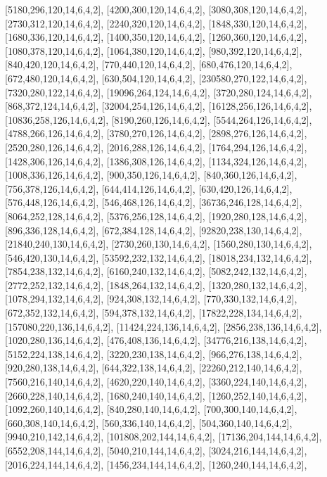 \documentclass[12pt]{amsart}
\begin{document}
[5180,296,120,14,6,4,2],   [4200,300,120,14,6,4,2],   [3080,308,120,14,6,4,2],   [2730,312,120,14,6,4,2],   [2240,320,120,14,6,4,2],   [1848,330,120,14,6,4,2],
[1680,336,120,14,6,4,2],   [1400,350,120,14,6,4,2],   [1260,360,120,14,6,4,2],   [1080,378,120,14,6,4,2],   [1064,380,120,14,6,4,2],   [980,392,120,14,6,4,2],
[840,420,120,14,6,4,2],   [770,440,120,14,6,4,2],   [680,476,120,14,6,4,2],   [672,480,120,14,6,4,2],   [630,504,120,14,6,4,2],   [230580,270,122,14,6,4,2],
[7320,280,122,14,6,4,2],   [19096,264,124,14,6,4,2],   [3720,280,124,14,6,4,2],   [868,372,124,14,6,4,2],   [32004,254,126,14,6,4,2],   [16128,256,126,14,6,4,2],
[10836,258,126,14,6,4,2],   [8190,260,126,14,6,4,2],   [5544,264,126,14,6,4,2],   [4788,266,126,14,6,4,2],   [3780,270,126,14,6,4,2],   [2898,276,126,14,6,4,2],
[2520,280,126,14,6,4,2],   [2016,288,126,14,6,4,2],   [1764,294,126,14,6,4,2],   [1428,306,126,14,6,4,2],   [1386,308,126,14,6,4,2],   [1134,324,126,14,6,4,2],
[1008,336,126,14,6,4,2],   [900,350,126,14,6,4,2],   [840,360,126,14,6,4,2],   [756,378,126,14,6,4,2],   [644,414,126,14,6,4,2],   [630,420,126,14,6,4,2],
[576,448,126,14,6,4,2],   [546,468,126,14,6,4,2],   [36736,246,128,14,6,4,2],   [8064,252,128,14,6,4,2],   [5376,256,128,14,6,4,2],   [1920,280,128,14,6,4,2],
[896,336,128,14,6,4,2],   [672,384,128,14,6,4,2],   [92820,238,130,14,6,4,2],   [21840,240,130,14,6,4,2],   [2730,260,130,14,6,4,2],   [1560,280,130,14,6,4,2],
[546,420,130,14,6,4,2],   [53592,232,132,14,6,4,2],   [18018,234,132,14,6,4,2],   [7854,238,132,14,6,4,2],   [6160,240,132,14,6,4,2],   [5082,242,132,14,6,4,2],
[2772,252,132,14,6,4,2],   [1848,264,132,14,6,4,2],   [1320,280,132,14,6,4,2],   [1078,294,132,14,6,4,2],   [924,308,132,14,6,4,2],   [770,330,132,14,6,4,2],
[672,352,132,14,6,4,2],   [594,378,132,14,6,4,2],   [17822,228,134,14,6,4,2],   [157080,220,136,14,6,4,2],   [11424,224,136,14,6,4,2],   [2856,238,136,14,6,4,2],
[1020,280,136,14,6,4,2],   [476,408,136,14,6,4,2],   [34776,216,138,14,6,4,2],   [5152,224,138,14,6,4,2],   [3220,230,138,14,6,4,2],   [966,276,138,14,6,4,2],
[920,280,138,14,6,4,2],   [644,322,138,14,6,4,2],   [22260,212,140,14,6,4,2],   [7560,216,140,14,6,4,2],   [4620,220,140,14,6,4,2],   [3360,224,140,14,6,4,2],
[2660,228,140,14,6,4,2],   [1680,240,140,14,6,4,2],   [1260,252,140,14,6,4,2],   [1092,260,140,14,6,4,2],   [840,280,140,14,6,4,2],   [700,300,140,14,6,4,2],
[660,308,140,14,6,4,2],   [560,336,140,14,6,4,2],   [504,360,140,14,6,4,2],   [9940,210,142,14,6,4,2],   [101808,202,144,14,6,4,2],   [17136,204,144,14,6,4,2],
[6552,208,144,14,6,4,2],   [5040,210,144,14,6,4,2],   [3024,216,144,14,6,4,2],   [2016,224,144,14,6,4,2],   [1456,234,144,14,6,4,2],   [1260,240,144,14,6,4,2],
\end{document}
